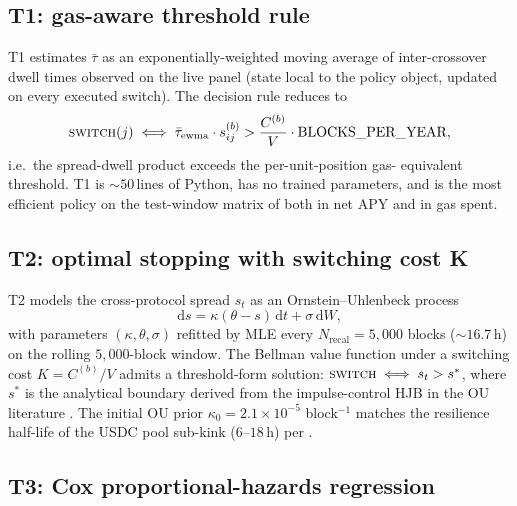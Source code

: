 \subsection{T1: gas-aware threshold rule}
\label{sec:methodology-t1}

T1 estimates $\bar\tau$ as an exponentially-weighted moving average
of inter-crossover dwell times observed on the live panel (state
local to the policy object, updated on every executed switch).  The
decision rule reduces to
\begin{equation}
\label{eq:t1}
\textsc{switch}(j) \iff
  \bar\tau_{\text{ewma}} \cdot s_{ij}^{(b)} > \frac{C^{(b)}}{V} \cdot \text{BLOCKS\_PER\_YEAR},
\end{equation}
i.e.\ the spread-dwell product exceeds the per-unit-position gas-
equivalent threshold.  T1 is $\sim 50$\,lines of Python, has no
trained parameters, and is the most efficient policy on the
test-window matrix of  both in net APY and
in gas spent.

\subsection{T2: optimal stopping with switching cost K}
\label{sec:methodology-t2}

T2 models the cross-protocol spread $s_t$ as an
Ornstein--Uhlenbeck process
\begin{equation}
\label{eq:ou}
\mathrm{d} s = \kappa(\theta - s)\,\mathrm{d} t + \sigma\,\mathrm{d} W,
\end{equation}
with parameters $(\kappa, \theta, \sigma)$ refitted by MLE every
$N_{\text{recal}} = 5{,}000$ blocks ($\sim 16.7$\,h) on the rolling
$5{,}000$-block window.  The Bellman value function under a
switching cost $K = C^{(b)} / V$ admits a threshold-form solution:
$\textsc{switch} \iff s_t > s^{*}$, where $s^{*}$ is the analytical
boundary derived from the impulse-control HJB in the OU literature
\cite{kissell2014}.  The initial OU prior
$\kappa_0 = 2.1 \times 10^{-5}$ block$^{-1}$ matches the resilience
half-life of the USDC pool sub-kink ($6$--$18$\,h) per
\cite{krause2005}.

\subsection{T3: Cox proportional-hazards regression}
\label{sec:methodology-t3}

